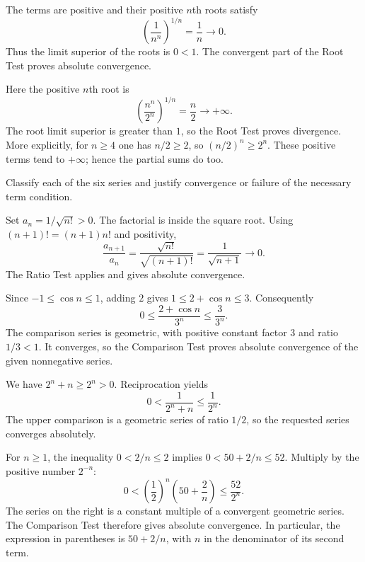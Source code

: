 The terms are positive and their positive $n$th roots satisfy
\[
 \left(\frac1{n^n}\right)^{1/n}=\frac1n\longrightarrow0.
\]
Thus the limit superior of the roots is $0<1$. The convergent
part of the Root Test proves absolute convergence.

Here the positive $n$th root is
\[
 \left(\frac{n^n}{2^n}\right)^{1/n}=\frac n2\longrightarrow+\infty.
\]
The root limit superior is greater than $1$, so the Root Test
proves divergence. More explicitly, for $n\ge4$ one has
$n/2\ge2$, so $(n/2)^n\ge2^n$. These positive terms tend to
$+\infty$; hence the partial sums do too.


\goal Classify each of the six series and justify convergence or
failure of the necessary term condition.

Set $a_n=1/\sqrt{n!}>0$. The factorial is inside the square root.
Using $(n+1)!=(n+1)n!$ and positivity,
\[
 \frac{a_{n+1}}{a_n}
 =\frac{\sqrt{n!}}{\sqrt{(n+1)!}}
 =\frac1{\sqrt{n+1}}\longrightarrow0.
\]
The Ratio Test applies and gives absolute convergence.

Since $-1\le\cos n\le1$, adding $2$ gives
$1\le2+\cos n\le3$. Consequently
\[
 0\le\frac{2+\cos n}{3^n}\le\frac3{3^n}.
\]
The comparison series is geometric, with positive constant factor
$3$ and ratio $1/3<1$. It converges, so the Comparison Test
proves absolute convergence of the given nonnegative series.

We have $2^n+n\ge2^n>0$. Reciprocation yields
\[
 0<\frac1{2^n+n}\le\frac1{2^n}.
\]
The upper comparison is a geometric series of ratio $1/2$,
so the requested series converges absolutely.

For $n\ge1$, the inequality $0<2/n\le2$ implies
$0<50+2/n\le52$. Multiply by the positive number $2^{-n}$:
\[
 0<\left(\frac12\right)^n\left(50+\frac2n\right)
 \le\frac{52}{2^n}.
\]
The series on the right is a constant multiple of a convergent
geometric series. The Comparison Test therefore gives absolute
convergence. In particular, the expression in parentheses is
$50+2/n$, with $n$ in the denominator of its second term.

